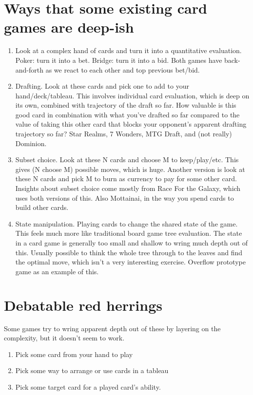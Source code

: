 \documentclass[12pt]{article}
\begin{document}
\section{Ways that some existing card games are deep-ish}

\begin{enumerate}

\item Look at a complex hand of cards and turn it into a quantitative evaluation.  Poker:  turn it into a bet.  Bridge:  turn it into a bid.  Both games have back-and-forth as we react to each other and top previous bet/bid.

\item Drafting.  Look at these cards and pick one to add to your hand/deck/tableau.  This involves individual card evaluation, which is deep on its own, combined with trajectory of the draft so far.  How valuable is this good card in combination with what you've drafted so far compared to the value of taking this other card that blocks your opponent's apparent drafting trajectory so far?  Star Realms, 7 Wonders, MTG Draft, and (not really) Dominion.

\item Subset choice.  Look at these N cards and choose M to keep/play/etc.  This gives (N choose M) possible moves, which is huge.  Another version is look at these N cards and pick M to burn as currency to pay for some other card.  Insights about subset choice come mostly from Race For the Galaxy, which uses both versions of this.  Also Mottainai, in the way you spend cards to build other cards.

\item State manipulation.  Playing cards to change the shared state of the game.  This feels much more like traditional board game tree evaluation.  The state in a card game is generally too small and shallow to wring much depth out of this.  Usually possible to think the whole tree through to the leaves and find the optimal move, which isn't a very interesting exercise.  Overflow prototype game as an example of this.
\end{enumerate}


\section{Debatable red herrings}

Some games try to wring apparent depth out of these by layering on the complexity, but it doesn't seem to work.

\begin{enumerate}

\item Pick some card from your hand to play

\item Pick some way to arrange or use cards in a tableau

\item Pick some target card for a played card's ability.

\end{enumerate}
\end{document}
